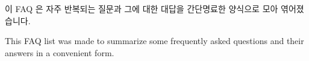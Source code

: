 \documentclass{article}
\begin{document}
\begin{CJK}{UTF8}{mj}

  이 FAQ 은 자주 반복되는 질문과 그에 대한 대답을 간단명료한 양식으로
  모아 엮어졌습니다.

\end{CJK}

This FAQ list was made to summarize some frequently asked questions
and their answers in a convenient form.
\end{document}
